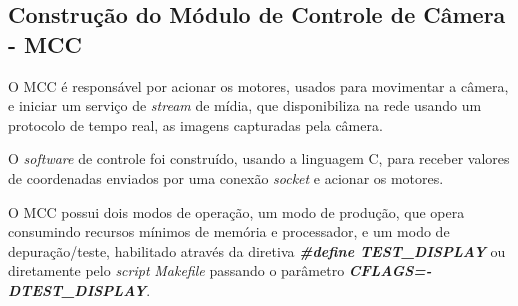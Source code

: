 \subsection{Construção do Módulo de Controle de Câmera - MCC}
\label{subsec:assemmodconcam}

O MCC é responsável por acionar os motores, usados para movimentar a câmera, e iniciar um serviço de \textit{stream} de mídia, que disponibiliza na rede usando um protocolo de tempo real, as imagens capturadas pela câmera.\par

O \textit{software} de controle foi construído, usando a linguagem C, para receber valores de coordenadas enviados por uma conexão \textit{socket} e acionar os motores.\par

O MCC possui dois modos de operação, um modo de produção, que opera consumindo recursos mínimos de memória e processador, e um modo de depuração/teste, habilitado através da diretiva \textbf{\textit{\#define TEST\_DISPLAY}} ou diretamente pelo \textit{script} \textit{Makefile} passando o parâmetro \textbf{\textit{CFLAGS=-DTEST\_DISPLAY}}.
